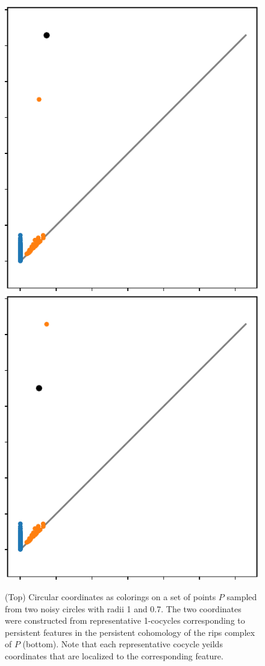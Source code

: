 \begin{figure}[htbp]
  \includegraphics[scale=0.5]{figures/circular_dgm1.pdf}\hspace{1.3in}
  \includegraphics[scale=0.5]{figures/circular_dgm2.pdf}
   \caption{(Top) Circular coordinates as colorings on a set of points $P$ sampled from two noisy circles with radii 1 and 0.7.
        The two coordinates were constructed from representative 1-cocycles corresponding to persistent features in the persistent cohomology of the rips complex of $P$ (bottom).
        Note that each representative cocycle yeilds coordinates that are localized to the corresponding feature.}
   \label{fig:circular}
\end{figure}

